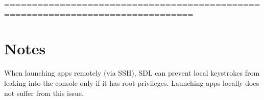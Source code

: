 ================================================================================ \section*{Notes }


\begin{DoxyItemize}
\item When launching apps remotely (via S\+SH), S\+DL can prevent local keystrokes from leaking into the console only if it has root privileges. Launching apps locally does not suffer from this issue. 
\end{DoxyItemize}